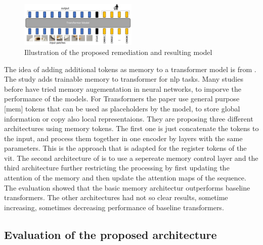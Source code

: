 \documentclass[conference]{IEEEtran}
\begin{document}
  \begin{figure}
    \centering
    \includegraphics[width=0.5\textwidth]{figures/register-architecture.png}
    \caption{Illustration of the proposed remediation and resulting model \cite{registers}}
    \label{fig:register-architecture}
  \end{figure}

  The idea of adding additional tokens as memory to a transformer model is from \cite{memorytransformer}. The study adds trainable memory to transformer for \ac{nlp} tasks. Many studies before have tried memory augementation in neural networks, to imporve the performance of the models. For Transformers the paper use general purpose [mem] tokens that can be used as placeholders by the model, to store global information or copy also local representaions. They are proposing three different architectures using memory tokens. The first one is just concatenate the tokens to the input, and process them together in one encoder by layers with the same parameters. This is the approach that is adapted for the register tokens of the \ac{vit}. The second architecture of \cite{memorytransformer} is to use a sepereate memory control layer and the third architecture further restricting the processing by first updating the attention of the memory and then update the attention maps of the sequence. The evaluation showed that the basic memory architectur outperforms baseline transformers. The other architectures had not so clear results, sometime increasing, sometimes decreasing performance of baseline transformers.

  \subsection{Evaluation of the proposed architecture}
\end{document}
